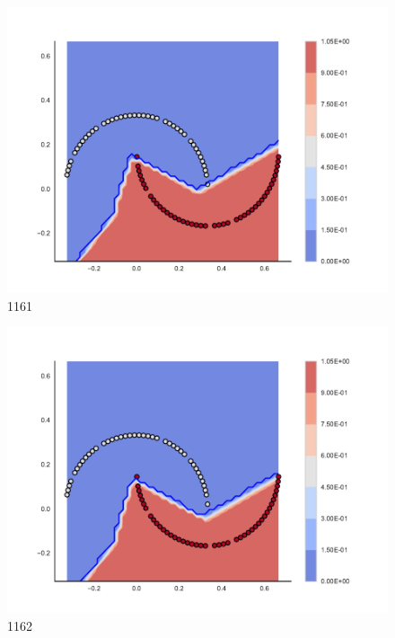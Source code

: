 \begin{subfigure}[b]{0.09\textwidth}
    \includegraphics[clip, trim=2.35cm 1.75cm 4.5cm 0cm,width=\textwidth]{img/convergence/1161.pdf}
    \caption{1161}
    \label{fig:convergence_1161}
\end{subfigure}
%
\begin{subfigure}[b]{0.09\textwidth}
    \includegraphics[clip, trim=2.35cm 1.75cm 4.5cm 0cm,width=\textwidth]{img/convergence/1162.pdf}
    \caption{1162}
    \label{fig:convergence_1162}
\end{subfigure}
%

